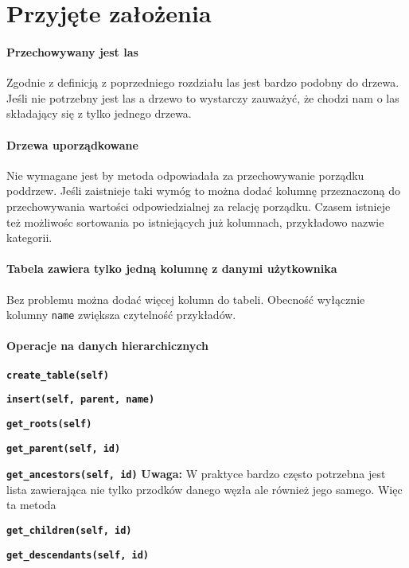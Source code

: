\section{Przyjęte założenia}

\paragraph{Przechowywany jest las}
Zgodnie z definicją z poprzedniego rozdziału las jest bardzo podobny do drzewa.
Jeśli nie potrzebny jest las a drzewo to wystarczy zauważyć,
że chodzi nam o las składający się z tylko jednego drzewa.


\paragraph{Drzewa uporządkowane}
Nie wymagane jest by metoda odpowiadała za przechowywanie porządku poddrzew.
Jeśli zaistnieje taki wymóg to można dodać kolumnę przeznaczoną do przechowywania wartości odpowiedzialnej za relację porządku.
Czasem istnieje też możliwośc sortowania po istniejących już kolumnach, przykładowo nazwie kategorii.


\paragraph{Tabela zawiera tylko jedną kolumnę z danymi użytkownika} 
Bez problemu można dodać więcej kolumn do tabeli.
Obecność wyłącznie kolumny \texttt{name} zwiększa czytelność przykładów.


\paragraph{Operacje na danych hierarchicznych}

\begin{itemize*}
    \item \textbf{\texttt{create\_table(self)}}
        
    \item \textbf{\texttt{insert(self, parent, name)}}
    \item \textbf{\texttt{get\_roots(self)}}
    \item \textbf{\texttt{get\_parent(self, id)}}
    \item \textbf{\texttt{get\_ancestors(self, id)}}
        \textbf{Uwaga:} W praktyce bardzo często potrzebna jest lista zawierająca nie tylko przodków danego węzła ale również jego samego.
        Więc ta metoda 
    \item \textbf{\texttt{get\_children(self, id)}}
    \item \textbf{\texttt{get\_descendants(self, id)}}
\end{itemize*}

